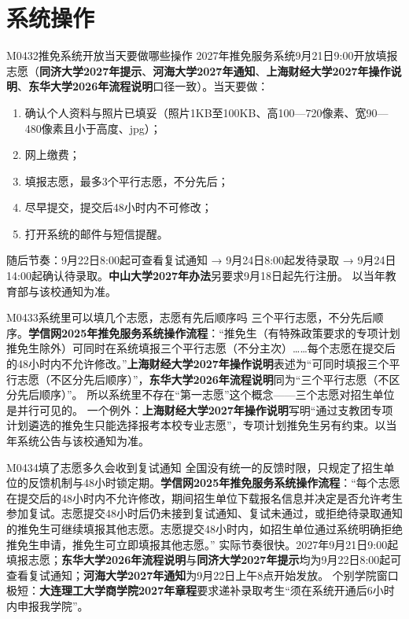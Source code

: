 \section{系统操作}
\begin{qa}{M0432}{推免系统开放当天要做哪些操作}
2027年推免服务系统9月21日9:00开放填报志愿（\textbf{同济大学2027年提示}、\textbf{河海大学2027年通知}、\textbf{上海财经大学2027年操作说明}、\textbf{东华大学2026年流程说明}口径一致）。当天要做：
\begin{enumerate}
  \item 确认个人资料与照片已填妥（照片1KB至100KB、高100—720像素、宽90—480像素且小于高度、jpg）；
  \item 网上缴费；
  \item 填报志愿，最多3个平行志愿，不分先后；
  \item 尽早提交，提交后48小时内不可修改；
  \item 打开系统的邮件与短信提醒。
\end{enumerate}
随后节奏：9月22日8:00起可查看复试通知 → 9月24日8:00起发待录取 → 9月24日14:00起确认待录取。\textbf{中山大学2027年办法}另要求9月18日起先行注册。
以当年教育部与该校通知为准。
\end{qa}

\begin{qa}{M0433}{系统里可以填几个志愿，志愿有先后顺序吗}
三个平行志愿，不分先后顺序。\textbf{学信网2025年推免服务系统操作流程}：“推免生（有特殊政策要求的专项计划推免生除外）可同时在系统填报三个平行志愿（不分主次）……每个志愿在提交后的48小时内不允许修改。”\textbf{上海财经大学2027年操作说明}表述为“可同时填报三个平行志愿（不区分先后顺序）”，\textbf{东华大学2026年流程说明}同为“三个平行志愿（不区分先后顺序）”。
所以系统里不存在“第一志愿”这个概念——三个志愿对招生单位是并行可见的。
一个例外：\textbf{上海财经大学2027年操作说明}写明“通过支教团专项计划遴选的推免生只能选择报考本校专业志愿”，专项计划推免生另有约束。以当年系统公告与该校通知为准。
\end{qa}

\begin{qa}{M0434}{填了志愿多久会收到复试通知}
全国没有统一的反馈时限，只规定了招生单位的反馈机制与48小时锁定期。\textbf{学信网2025年推免服务系统操作流程}：“每个志愿在提交后的48小时内不允许修改，期间招生单位下载报名信息并决定是否允许考生参加复试。志愿提交48小时后仍未接到复试通知、复试未通过，或拒绝待录取通知的推免生可继续填报其他志愿。志愿提交48小时内，如招生单位通过系统明确拒绝推免生申请，推免生可立即填报其他志愿。”
实际节奏很快。2027年9月21日9:00起填报志愿；\textbf{东华大学2026年流程说明}与\textbf{同济大学2027年提示}均为9月22日8:00起可查看复试通知；\textbf{河海大学2027年通知}为9月22日上午8点开始发放。
个别学院窗口极短：\textbf{大连理工大学商学院2027年章程}要求递补录取考生“须在系统开通后6小时内申报我学院”。
\end{qa}

